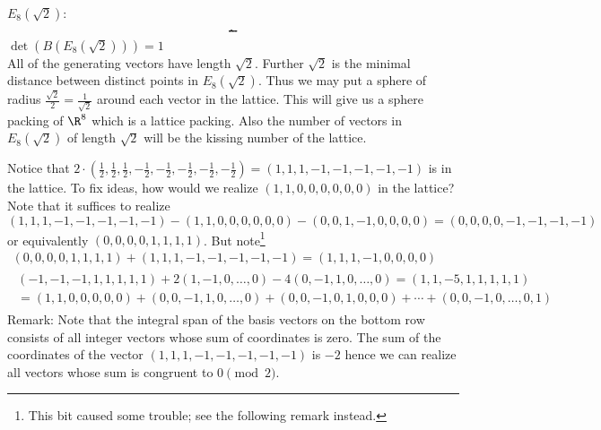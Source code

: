 $E_8(\sqrt2)$:
\setlength{\unitlength}{0.75cm}
\[\begin{picture}(6,1)(0,0)
\multiput(0,0)(1,0){7}{\circle*{0.2}}
\put(2,1){\circle*{0.2}}
\put(0,0){\line(1,0){6}}
\put(2,0){\line(0,1){1}}
\end{picture}\]
$\det(B(E_8(\sqrt2)))=1$ \\
All of the generating vectors have length $\sqrt2$.  Further $\sqrt2$ is the minimal distance between distinct points in $E_8(\sqrt2)$.  Thus we may put a sphere of radius $\frac{\sqrt2}{2}=\frac{1}{\sqrt2}$ around each vector in the lattice.  This will give us a sphere packing of $\R^8$ which is a lattice packing.  Also the number of vectors in $E_8(\sqrt2)$ of length $\sqrt2$ will be the kissing number of the lattice.

Notice that $2\cdot(\frac12,\frac12,\frac12,-\frac12,-\frac12,-\frac12,-\frac12,-\frac12)=(1,1,1,-1,-1,-1,-1,-1)$ is in the lattice.  To fix ideas, how would we realize $(1,1,0,0,0,0,0,0)$ in the lattice?  Note that it suffices to realize $(1,1,1,-1,-1,-1,-1,-1)-(1,1,0,0,0,0,0,0)-(0,0,1,-1,0,0,0,0)=(0,0,0,0,-1,-1,-1,-1)$ or equivalently $(0,0,0,0,1,1,1,1)$.  But note\footnote{This bit caused some trouble; see the following remark instead.}
\begin{gather*}
(0,0,0,0,1,1,1,1)+(1,1,1,-1,-1,-1,-1,-1)=(1,1,1,-1,0,0,0,0) \\
\begin{multlined}
(-1,-1,-1,1,1,1,1,1)+2(1,-1,0,\dotsc,0)-4(0,-1,1,0,\dotsc,0)=(1,1,-5,1,1,1,1,1)\\
=(1,1,0,0,0,0,0)+(0,0,-1,1,0,\dotsc,0)+(0,0,-1,0,1,0,0,0)+\dotsb+(0,0,-1,0,\dotsc,0,1)
\end{multlined}
\end{gather*}
Remark: Note that the integral span of the basis vectors on the bottom row consists of all integer vectors whose sum of coordinates is zero.  The sum of the coordinates of the vector $(1,1,1,-1,-1,-1,-1,-1)$ is $-2$ hence we can realize all vectors whose sum is congruent to $0\pmod2$.

